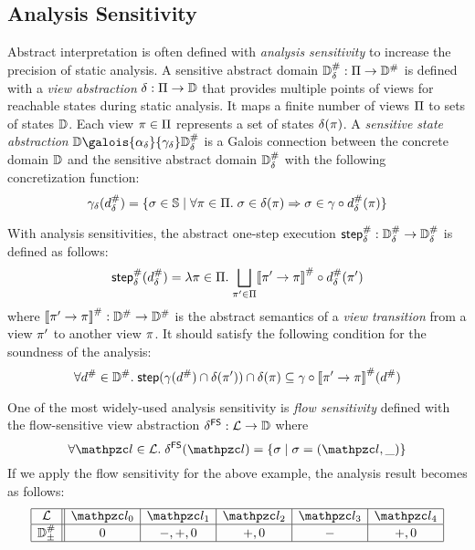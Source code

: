 \subsection{Analysis Sensitivity}

Abstract interpretation is often defined with \textit{analysis sensitivity} to
increase the precision of static analysis.  A sensitive abstract domain
${\mathbb{D}}^{\#}_\delta: \Pi \rightarrow {\mathbb{D}}^{\#}$ is defined with a \textit{view
abstraction} $\delta: \Pi \rightarrow \mathbb{D}$ that provides multiple points
of views for reachable states during static analysis.  It maps a finite number
of views $\Pi$ to sets of states $\mathbb{D}$. Each view $\pi \in \Pi$
represents a set of states $\delta(\pi)$.
A \textit{sensitive state abstraction} $\dom
\galois{\alpha_\viewmap}{\gamma_\viewmap} \sabsdom$ is a Galois connection between
the concrete domain $\mathbb{D}$ and the sensitive abstract domain ${\mathbb{D}}^{\#}_\delta$ with the
following concretization function:
\[
  \gamma_\delta({d}^{\#}_\delta) = \{ \sigma \in \mathbb{S} \mid \forall \pi \in \Pi.
  \; \sigma \in \delta(\pi) \Rightarrow \sigma \in \gamma \circ {d}^{\#}_\delta(\pi) \}
\]

With analysis sensitivities, the abstract one-step execution ${\textsf{step}}^{\#}_\delta:
{\mathbb{D}}^{\#}_\delta \rightarrow {\mathbb{D}}^{\#}_\delta$ is defined as follows:
\[
  {\textsf{step}}^{\#}_\delta({d}^{\#}_\delta) = \lambda \pi \in \Pi. \; \underset{\pi' \in
  \Pi}{\bigsqcup}{{[\![{\pi' \rightarrow \pi}]\!]}^{\#} \circ {d}^{\#}_\delta(\pi')}
\]
where ${[\![{\pi' \rightarrow \pi}]\!]}^{\#}: {\mathbb{D}}^{\#} \rightarrow {\mathbb{D}}^{\#}$ is the abstract
semantics of a \textit{view transition} from a view $\pi'$ to another view
$\pi$.  It should satisfy the following condition for the soundness of the
analysis:
\[
  \forall {d}^{\#} \in {\mathbb{D}}^{\#}. \; \textsf{step}(\gamma({d}^{\#}) \cap \delta(\pi'))
  \cap \delta(\pi) \subseteq \gamma \circ
  {[\![{\pi' \rightarrow \pi}]\!]}^{\#}({d}^{\#})
\]

One of the most widely-used analysis sensitivity is \textit{flow sensitivity}
defined with the flow-sensitive view abstraction $\delta^{\textsf{FS}}: \mathcal{L}
\rightarrow \mathbb{D}$ where
\[
  \forall \lab\in\labset. \; \fsviewmap(\lab) = \{ \st \mid \st = (\lab, \_) \}
\]
If we apply the flow sensitivity for the above example, the analysis result
becomes as follows:
\[
  \begin{array}{|c||c|c|c|c|c|}\hline
    \labset & \lab_0 & \lab_1 & \lab_2 & \lab_3 & \lab_4\\\hline
    \absdom_\pm & 0 & -, +, 0 & +, 0 & - & +, 0\\\hline
  \end{array}
\]


